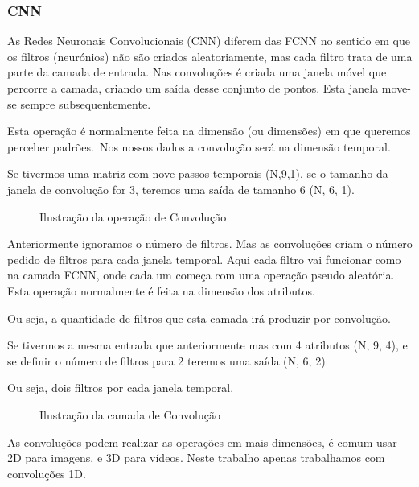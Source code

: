 \subsubsection{CNN\label{se:cnn_sec}}

As Redes Neuronais Convolucionais (\gls{CNN}) diferem das \gls{FCNN} no sentido em que os filtros (neurónios) não são criados aleatoriamente, mas cada filtro trata de uma parte da camada de entrada. Nas convoluções é criada uma janela móvel que percorre a camada, criando um saída desse conjunto de pontos. Esta janela move-se sempre subsequentemente.\par
Esta operação é normalmente feita na dimensão (ou dimensões) em que queremos perceber padrões.\
Nos nossos dados a convolução será na dimensão temporal.\par
Se tivermos uma matriz com nove passos temporais (N,9,1), se o tamanho da janela de convolução for 3, teremos uma saída de tamanho 6 (N, 6, 1).\par
\begin{figure}[H]
	\centering
	\resizebox{0.7\linewidth}{!}{}
	\caption{Ilustração da operação de Convolução}
	\label{fig:conv_layer1D}
\end{figure}

Anteriormente ignoramos o número de filtros. Mas as convoluções criam o número pedido de filtros para cada janela temporal. Aqui cada filtro vai funcionar como na camada \gls{FCNN}, onde cada um começa com uma operação pseudo aleatória. Esta operação normalmente é feita na dimensão dos atributos.\par
Ou seja, a quantidade de filtros que esta camada irá produzir por convolução.\par
Se tivermos a mesma entrada que anteriormente mas com 4 atributos (N, 9, 4), e se definir o número de filtros para 2 teremos uma saída (N, 6, 2).\par
Ou seja, dois filtros por cada janela temporal.\par


\begin{figure}[H]
	\centering
	\resizebox{0.7\linewidth}{!}{}
	\caption{Ilustração da camada de Convolução}
	\label{fig:conv_layer}
\end{figure}

As convoluções podem realizar as operações em mais dimensões, é comum usar 2D para imagens, e 3D para vídeos. Neste trabalho apenas trabalhamos com convoluções 1D.\par

